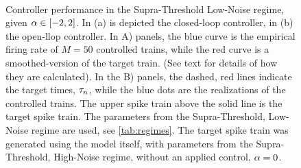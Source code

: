  
\begin{figure}[htp]
\begin{center}
\\
  \caption[Controller simulations for Supra-Threshold Low-Noise
regime]{Controller performance in the Supra-Threshold Low-Noise regime,
  given $\alpha \in [-2,2]$.
  In (a) is depicted the closed-loop controller, in (b) the open-llop
  controller.
  In A) panels, the blue curve is the empirical firing
  rate of $M=50$ controlled trains, while the red curve is a
  smoothed-version of the target train. 
  (See text for details of how they are calculated). 
  In the B) panels, the dashed, red lines indicate the target times,
  ${\tau}_n$, while the blue dots are the realizations of the controlled trains.  
  The upper spike train above the solid line is the target spike train.
  The parameters from the Supra-Threshold, Low-Noise regime are used, see
  \cref{tab:regimes}. 
  The target spike train was generated
  using the model itself, with parameters from the Supra-Threshold, High-Noise regime, without an applied
  control, $\alpha=0$.
  } 
  \label{fig:targettrain_lownoise} 
\end{center} 
\end{figure}

